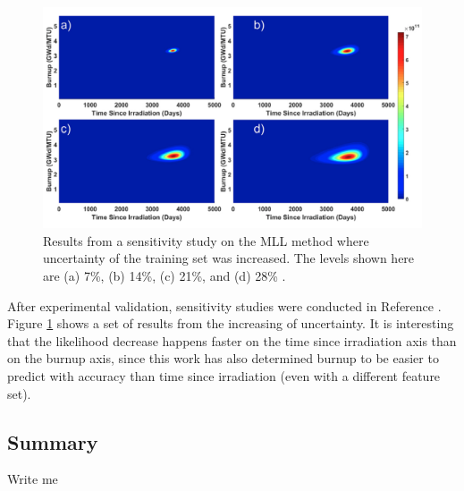 \begin{figure}[!htb]
  \centering
  \includegraphics[width=\linewidth]{./chapters/litrev/tamu2.png}
  \caption[Sensitivity of likelihood to training set uncertainty]
          {Results from a sensitivity study on the \gls{MLL} method where 
           uncertainty of the training set was increased. The levels shown 
           here are (a) 7\%, (b) 14\%, (c) 21\%, and (d) 28\% 
           \cite{mll_sensitivity}.}
  \label{fig:tamu2}
\end{figure}

After experimental validation, sensitivity studies were conducted in Reference
\cite{mll_sensitivity}.  Figure \ref{fig:tamu2} shows a set of results from the
increasing of uncertainty. It is interesting that the likelihood decrease
happens faster on the time since irradiation axis than on the burnup axis,
since this work has also determined burnup to be easier to predict with
accuracy than time since irradiation (even with a different feature set).

\subsection{Summary}

Write me
